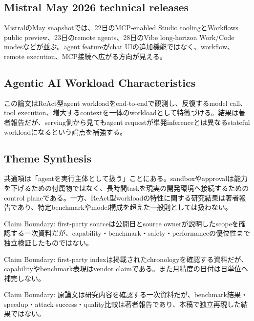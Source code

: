\subsection{Mistral May 2026 technical releases}

MistralのMay snapshotでは、22日のMCP-enabled Studio toolingとWorkflows public preview、23日のremote agents、28日のVibe long-horizon Work/Code modesなどが並ぶ。agent featureがchat UIの追加機能ではなく、workflow、remote execution、MCP接続へ広がる方向が見える。\autocite{src-d8b7c1c36830}


\subsection{Agentic AI Workload Characteristics}

この論文はReAct型agent workloadをend-to-endで観測し、反復するmodel call、tool execution、増大するcontextを一体のworkloadとして特徴づける。結果は著者報告だが、serving側から見てもagent requestが単発inferenceとは異なるstateful workloadになるという論点を補強する。\autocite{src-ac04c00cf21f}


\subsection{Theme Synthesis}

共通項は「agentを実行主体として扱う」ことにある。sandboxやapprovalは能力を下げるための付属物ではなく、長時間taskを現実の開発環境へ接続するためのcontrol planeである。一方、ReAct型workloadの特性に関する研究結果は著者報告であり、特定benchmarkやmodel構成を超えた一般則としては扱わない。\autocite{src-4a3442a5ca8c,src-66be12207714,src-9191d43918fc,src-ac04c00cf21f,src-d8b7c1c36830}


\begin{claimboundary}
Claim Boundary: first-party sourceは公開日とsource ownerが説明したscopeを確認する一次資料だが、capability・benchmark・safety・performanceの優位性まで独立検証したものではない。\autocite{src-4a3442a5ca8c,src-66be12207714,src-9191d43918fc,src-ac04c00cf21f,src-d8b7c1c36830}
\end{claimboundary}

\begin{claimboundary}
Claim Boundary: first-party indexは掲載されたchronologyを確認する資料だが、capabilityやbenchmark表現はvendor claimである。また月精度の日付は日単位へ補完しない。\autocite{src-4a3442a5ca8c,src-66be12207714,src-9191d43918fc,src-ac04c00cf21f,src-d8b7c1c36830}
\end{claimboundary}

\begin{claimboundary}
Claim Boundary: 原論文は研究内容を確認する一次資料だが、benchmark結果・speedup・attack success・quality比較は著者報告であり、本稿で独立再現した結果ではない。\autocite{src-4a3442a5ca8c,src-66be12207714,src-9191d43918fc,src-ac04c00cf21f,src-d8b7c1c36830}
\end{claimboundary}
